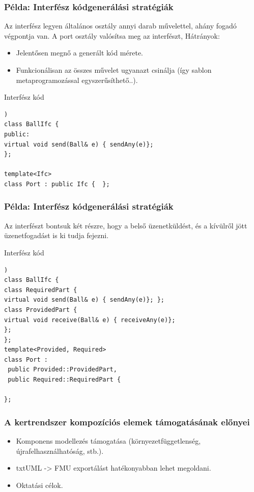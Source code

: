 \documentclass[11pt]{beamer}
\begin{document}
\begin{frame}[fragile]
	\frametitle{Példa: Interfész kódgenerálási stratégiák}
	
	Az interfész legyen általános osztály annyi darab művelettel, ahány fogadó végpontja van. A port osztály valósítsa meg az interfészt, 
	Hátrányok:
	\begin{itemize}
	\item Jelentősen megnő a generált kód mérete.
	\item Funkcionálisan az összes művelet ugyanazt csinálja (így sablon metaprogramozással egyszerűsíthető..).
	\end{itemize}
	
	\begin{block}{Interfész kód}
	\begin{lstlisting}[basicstyle=\small])
class BallIfc {
public:
virtual void send(Ball& e) { sendAny(e)}; 
};

template<Ifc>
class Port : public Ifc {  };
	\end{lstlisting}
	\end{block}

\end{frame}

\begin{frame}[fragile]
	\frametitle{Példa: Interfész kódgenerálási stratégiák}
	
	Az interfészt bontsuk két részre, hogy a belső üzenetküldést, és a kívülről jött üzenetfogadást is ki tudja fejezni. 
	
	\begin{block}{Interfész kód}
	\begin{lstlisting}[basicstyle=\small])
class BallIfc {
class RequiredPart {
virtual void send(Ball& e) { sendAny(e)}; };
class ProvidedPart {
virtual void receive(Ball& e) { receiveAny(e)}; 
};
};
template<Provided, Required>
class Port :
 public Provided::ProvidedPart, 
 public Required::RequiredPart { 

};
	\end{lstlisting}
	\end{block}

\end{frame}

\begin{frame}
	\frametitle{A kertrendszer kompozíciós elemek támogatásának előnyei}
	
	\begin{itemize}
	\item Komponens modellezés támogatása (környezetfüggetlenség, újrafelhasználhatóság, stb.). 
	\item {txtUML} -> {FMU} exportálást hatékonyabban lehet megoldani. 
	\item Oktatási célok.
	\end{itemize}

\end{frame}
\end{document}
